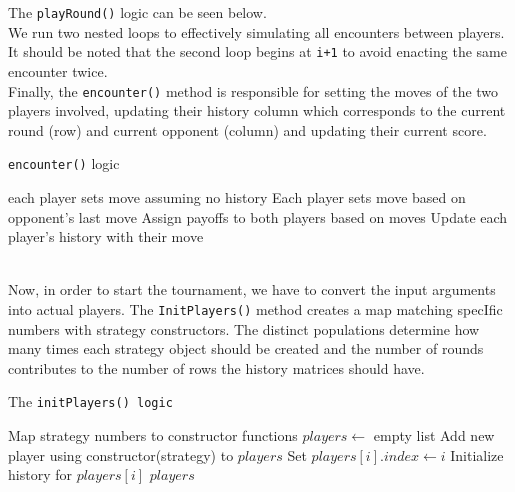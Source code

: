 \documentclass[12pt]{report}
\begin{document}
The \texttt{playRound()} logic can be seen below.\\We run two nested loops to effectively simulating all encounters between players. It should be noted that the second loop begins at \texttt{i+1} to avoid enacting the same encounter twice.\\
Finally, the \texttt{encounter()} method is responsible for setting the moves of the two players involved, updating their history column which corresponds to the current round (row) and current opponent (column) and updating their current score.
\begin{algorithm}
\caption{\texttt{encounter()} logic}
\begin{algorithmic}[1]
   \State each player sets move assuming no history
  \Else 
    \State Each player sets move based on opponent's last move
  \EndIf
  \State Assign payoffs to both players based on moves
  \State Update each player's history with their move     
\end{algorithmic}
\end{algorithm}
\\Now, in order to start the tournament, we have to convert the input arguments into actual players. The \texttt{InitPlayers()} method creates a map matching specIfic numbers with strategy constructors. The distinct populations determine how many times each strategy object should be created and the number of rounds contributes to the number of rows the history matrices should have.
\newpage
\begin{algorithm}
\caption{The \texttt{initPlayers() logic}}
\begin{algorithmic}[1]
\State Map strategy numbers to constructor functions
\State $players \gets$ empty list
        \State Add new player using constructor(strategy) to $players$
      \EndFor
   \Else
       \State {}
   \EndIf
\EndFor
{}
\State Set $players[i].index \gets i$
\State Initialize history for $players[i]$
\EndFor
\State \Return $players$
\end{algorithmic}
\end{algorithm}
\end{document}
